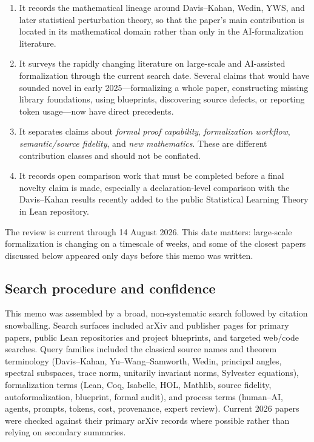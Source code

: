 \documentclass[11pt]{article}
\begin{document}
\begin{enumerate}
  \item It records the mathematical lineage around Davis--Kahan, Wedin, YWS,
        and later statistical perturbation theory, so that the paper's main
        contribution is located in its mathematical domain rather than only in
        the AI-formalization literature.
  \item It surveys the rapidly changing literature on large-scale and
        AI-assisted formalization through the current search date.  Several
        claims that would have sounded novel in early 2025---formalizing a whole
        paper, constructing missing library foundations, using blueprints,
        discovering source defects, or reporting token usage---now have direct
        precedents.
  \item It separates claims about \emph{formal proof capability},
        \emph{formalization workflow}, \emph{semantic/source fidelity}, and
        \emph{new mathematics}.  These are different contribution classes and
        should not be conflated.
  \item It records open comparison work that must be completed before a final
        novelty claim is made, especially a declaration-level comparison with
        the Davis--Kahan results recently added to the public Statistical
        Learning Theory in Lean repository.
\end{enumerate}

The review is current through 14 August 2026.  This date matters: large-scale
formalization is changing on a timescale of weeks, and some of the closest
papers discussed below appeared only days before this memo was written.

\subsection{Search procedure and confidence}
\label{sec:search-procedure}

This memo was assembled by a broad, non-systematic search followed by citation
snowballing.  Search surfaces included arXiv and publisher pages for primary
papers, public Lean repositories and project blueprints, and targeted web/code
searches.  Query families included the classical source names and theorem
terminology (Davis--Kahan, Yu--Wang--Samworth, Wedin, principal angles,
spectral subspaces, trace norm, unitarily invariant norms, Sylvester equations),
formalization terms (Lean, Coq, Isabelle, HOL, Mathlib, source fidelity,
autoformalization, blueprint, formal audit), and process terms (human--AI,
agents, prompts, tokens, cost, provenance, expert review).  Current 2026 papers
were checked against their primary arXiv records where possible rather than
relying on secondary summaries.
\end{document}

